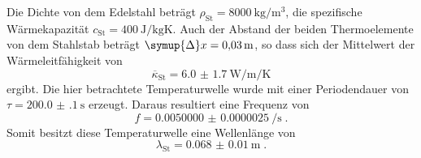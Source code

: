 Die Dichte von dem Edelstahl beträgt $\rho_\text{St} = \SI{8000}{\kilogram\per\cubic\metre}$, die spezifische Wärmekapazität 
$c_\text{St} = \SI{400}{\joule\per\kilogram\kelvin}$. Auch der Abstand der beiden Thermoelemente von dem Stahlstab
beträgt $\symup{\Delta} x = \SI{0.03}{\metre}$, so dass sich der Mittelwert der Wärmeleitfähigkeit von
\begin{equation}
  \overline{\kappa}_\text{St} = \SI{6.0(17)}{\watt\per\metre\per\kelvin}
\end{equation}
ergibt. Die hier betrachtete Temperaturwelle wurde mit einer Periodendauer von $\tau = \SI{200.0(1)}{\second}$ erzeugt.
Daraus resultiert eine Frequenz von 
\begin{equation}
  f = \SI{0.0050000(25)}{\per\second} \; \text{.}
\end{equation}
Somit besitzt diese Temperaturwelle eine Wellenlänge von 
\begin{equation}
  \lambda_\text{St} = \SI{0.068(10)}{\metre} \; \text{.}
\end{equation}
